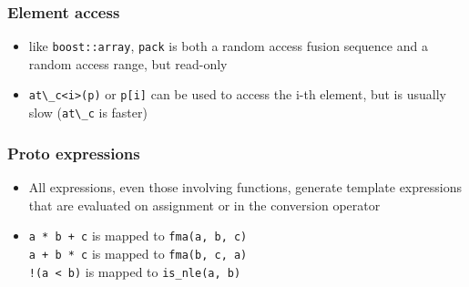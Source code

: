 \documentclass{beamer}
\begin{document}
\begin{frame}
	\frametitle{Element access}
	
	\begin{itemize}
		\item like \lstinline{boost::array}, \lstinline{pack} is both a random access fusion sequence and a random access range, but read-only
		\item \lstinline{at\_c<i>(p)} or \lstinline{p[i]} can be used to access the i-th element, but is usually slow (\lstinline{at\_c} is faster)
	\end{itemize}
	
\end{frame}

\begin{frame}
	\frametitle{Proto expressions}
	
	\begin{itemize}
		\item All expressions, even those involving functions,
		      generate template expressions that are evaluated on assignment
		      or in the conversion operator
		\item \lstinline{a * b + c} is mapped to \lstinline{fma(a, b, c)}\\
		      \lstinline{a + b * c} is mapped to \lstinline{fma(b, c, a)}\\
		      \lstinline{!(a < b)} is mapped to \lstinline{is_nle(a, b)}
	\end{itemize}
	
\end{frame}
\end{document}
